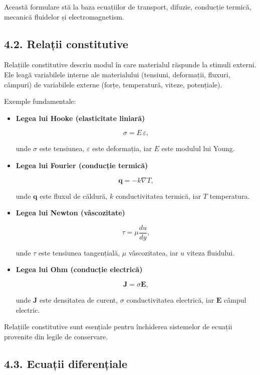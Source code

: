 \documentclass[12pt,a4paper]{article}
\begin{document}
Această formulare stă la baza ecuațiilor de transport, difuzie, conducție termică, mecanică fluidelor și electromagnetism.

\subsection{4.2. Relații constitutive}

Relațiile constitutive descriu modul în care materialul răspunde la stimuli externi. Ele leagă variabilele interne ale materialului (tensiuni, deformații, fluxuri, câmpuri) de variabilele externe (forțe, temperatură, viteze, potențiale).

Exemple fundamentale:

\begin{itemize}
    \item \textbf{Legea lui Hooke (elasticitate liniară)}  
    

\[
    \sigma = E \, \varepsilon,
    \]


    unde $\sigma$ este tensiunea, $\varepsilon$ este deformația, iar $E$ este modulul lui Young.

    \item \textbf{Legea lui Fourier (conducție termică)}  
    

\[
    \mathbf{q} = -k \nabla T,
    \]


    unde $\mathbf{q}$ este fluxul de căldură, $k$ conductivitatea termică, iar $T$ temperatura.

    \item \textbf{Legea lui Newton (vâscozitate)}  
    

\[
    \tau = \mu \frac{du}{dy},
    \]


    unde $\tau$ este tensiunea tangențială, $\mu$ vâscozitatea, iar $u$ viteza fluidului.

    \item \textbf{Legea lui Ohm (conducție electrică)}  
    

\[
    \mathbf{J} = \sigma \mathbf{E},
    \]


    unde $\mathbf{J}$ este densitatea de curent, $\sigma$ conductivitatea electrică, iar $\mathbf{E}$ câmpul electric.
\end{itemize}

Relațiile constitutive sunt esențiale pentru închiderea sistemelor de ecuații provenite din legile de conservare.

\subsection{4.3. Ecuații diferențiale}
\end{document}
